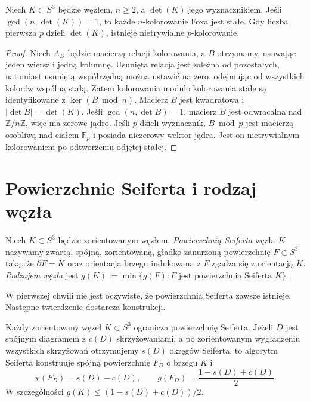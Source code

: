 \begin{stwierdzenie}
Niech $K\subset S^3$ będzie węzłem, $n\ge2$, a
$\det(K)$ jego wyznacznikiem. Jeśli
$\gcd(n,\det(K))=1$, to każde $n$-kolorowanie Foxa
jest stałe. Gdy liczba pierwsza $p$ dzieli $\det(K)$,
istnieje nietrywialne $p$-kolorowanie.
\end{stwierdzenie}

\begin{proof}
Niech $A_D$ będzie macierzą relacji kolorowania, a
$B$ otrzymamy, usuwając jeden wiersz i jedną kolumnę.
Usunięta relacja jest zależna od pozostałych, natomiast
usuniętą współrzędną można ustawić na zero, odejmując
od wszystkich kolorów wspólną stałą. Zatem kolorowania
modulo kolorowania stałe są identyfikowane z
$\ker(B\bmod n)$. Macierz $B$ jest kwadratowa i
$|\det B|=\det(K)$. Jeśli $\gcd(n,\det B)=1$,
macierz $B$ jest odwracalna nad $\mathbb Z/n\mathbb Z$,
więc ma zerowe jądro. Jeśli $p$ dzieli wyznacznik,
$B\bmod p$ jest macierzą osobliwą nad ciałem
$\mathbb F_p$ i posiada niezerowy wektor jądra.
Jest on nietrywialnym kolorowaniem po odtworzeniu
odjętej stałej.
\end{proof}

\section{Powierzchnie Seiferta i rodzaj węzła}
\label{sec:kt-seifert}

\begin{definicja}
Niech $K\subset S^3$ będzie zorientowanym węzłem.
\emph{Powierzchnią Seiferta} węzła $K$ nazywamy zwartą,
spójną, zorientowaną, gładko zanurzoną powierzchnię
$F\subset S^3$ taką, że $\partial F=K$ oraz orientacja
brzegu indukowana z $F$ zgadza się z orientacją $K$.
\emph{Rodzajem węzła} jest $g(K):=\min\{g(F):F\text{ jest
powierzchnią Seiferta }K\}$.
\end{definicja}

W pierwszej chwili nie jest oczywiste, że powierzchnia Seiferta
zawsze istnieje. Następne twierdzenie dostarcza konstrukcji.

\begin{twierdzenie}
Każdy zorientowany węzeł $K\subset S^3$ ogranicza powierzchnię
Seiferta. Jeżeli $D$ jest spójnym diagramem z $c(D)$ skrzyżowaniami,
a po zorientowanym wygładzeniu wszystkich skrzyżowań otrzymujemy
$s(D)$ okręgów Seiferta, to algorytm Seiferta konstruuje spójną
powierzchnię $F_D$ o brzegu $K$ i
\[
\chi(F_D)=s(D)-c(D),\qquad
 g(F_D)=\frac{1-s(D)+c(D)}{2}.
\]
W szczególności $g(K)\leq(1-s(D)+c(D))/2$.
\end{twierdzenie}

